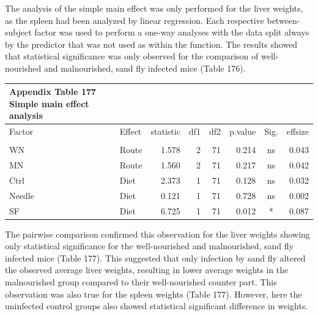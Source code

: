 \documentclass[
  12pt,
  letterpaper,
]{article}
\begin{document}
The analysis of the simple main effect was only performed for the liver weights, as the spleen had been analyzed by linear regression. Each respective between-subject factor was used to perform a one-way analyses with the data split always by the predictor that was not used as within the function. The results showed that statistical significance was only observed for the comparison of well-nourished and malnourished, sand fly infected mice (Table 176).

\begingroup
\fontsize{12.0pt}{14.4pt}\selectfont
\begin{longtable}{l|lrrrrcr}
\caption*{
{\large \textbf{Appendix Table 177}} \\ 
{\small \textbf{Simple main effect analysis}}
} \\ 
\toprule
Factor & {Effect} & {statistic} & {df1} & {df2} & {p.value} & {Sig.} & {effsize} \\ 
\midrule\addlinespace[2.5pt]
\multicolumn{8}{l}{Liver} \\[2.5pt] 
\midrule\addlinespace[2.5pt]
WN & Route & 1.578 & 2 & 71 & 0.214 & ns & 0.043 \\ 
MN & Route & 1.560 & 2 & 71 & 0.217 & ns & 0.042 \\ 
Ctrl & Diet & 2.373 & 1 & 71 & 0.128 & ns & 0.032 \\ 
Needle & Diet & 0.121 & 1 & 71 & 0.728 & ns & 0.002 \\ 
SF & Diet & 6.725 & 1 & 71 & 0.012 & * & 0.087 \\ 
\bottomrule
\end{longtable}
\endgroup

The pairwise comparison confirmed this observation for the liver weights showing only statistical significance for the well-nourished and malnourished, sand fly infected mice (Table 177). This suggested that only infection by sand fly altered the observed average liver weights, resulting in lower average weights in the malnourished group compared to their well-nourished counter part. This observation was also true for the spleen weights (Table 177). However, here the uninfected control groups also showed statistical significant difference in weights.
\end{document}
